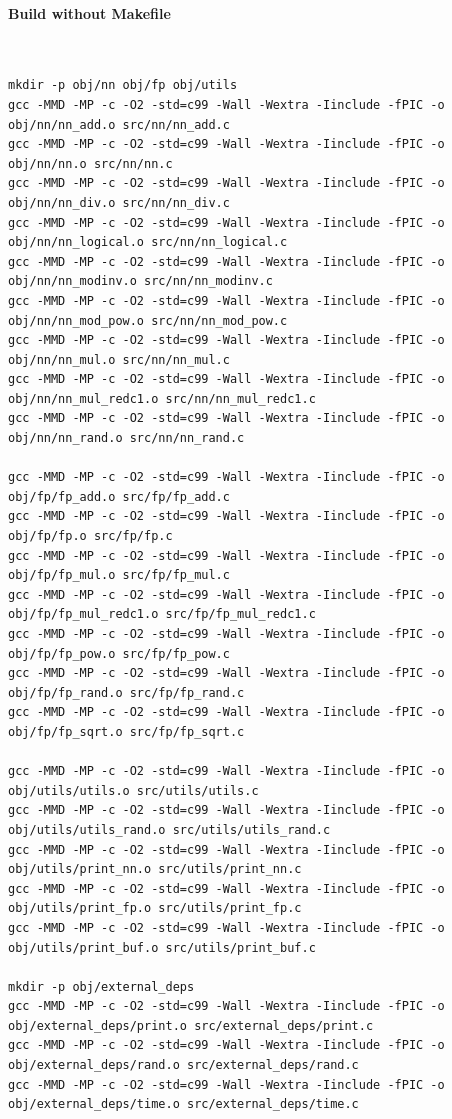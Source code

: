 \paragraph{Build without Makefile}\ \\
\begin{lstlisting}[numbers=none]
mkdir -p obj/nn obj/fp obj/utils
gcc -MMD -MP -c -O2 -std=c99 -Wall -Wextra -Iinclude -fPIC -o obj/nn/nn_add.o src/nn/nn_add.c
gcc -MMD -MP -c -O2 -std=c99 -Wall -Wextra -Iinclude -fPIC -o obj/nn/nn.o src/nn/nn.c
gcc -MMD -MP -c -O2 -std=c99 -Wall -Wextra -Iinclude -fPIC -o obj/nn/nn_div.o src/nn/nn_div.c
gcc -MMD -MP -c -O2 -std=c99 -Wall -Wextra -Iinclude -fPIC -o obj/nn/nn_logical.o src/nn/nn_logical.c
gcc -MMD -MP -c -O2 -std=c99 -Wall -Wextra -Iinclude -fPIC -o obj/nn/nn_modinv.o src/nn/nn_modinv.c
gcc -MMD -MP -c -O2 -std=c99 -Wall -Wextra -Iinclude -fPIC -o obj/nn/nn_mod_pow.o src/nn/nn_mod_pow.c
gcc -MMD -MP -c -O2 -std=c99 -Wall -Wextra -Iinclude -fPIC -o obj/nn/nn_mul.o src/nn/nn_mul.c
gcc -MMD -MP -c -O2 -std=c99 -Wall -Wextra -Iinclude -fPIC -o obj/nn/nn_mul_redc1.o src/nn/nn_mul_redc1.c
gcc -MMD -MP -c -O2 -std=c99 -Wall -Wextra -Iinclude -fPIC -o obj/nn/nn_rand.o src/nn/nn_rand.c

gcc -MMD -MP -c -O2 -std=c99 -Wall -Wextra -Iinclude -fPIC -o obj/fp/fp_add.o src/fp/fp_add.c
gcc -MMD -MP -c -O2 -std=c99 -Wall -Wextra -Iinclude -fPIC -o obj/fp/fp.o src/fp/fp.c
gcc -MMD -MP -c -O2 -std=c99 -Wall -Wextra -Iinclude -fPIC -o obj/fp/fp_mul.o src/fp/fp_mul.c
gcc -MMD -MP -c -O2 -std=c99 -Wall -Wextra -Iinclude -fPIC -o obj/fp/fp_mul_redc1.o src/fp/fp_mul_redc1.c
gcc -MMD -MP -c -O2 -std=c99 -Wall -Wextra -Iinclude -fPIC -o obj/fp/fp_pow.o src/fp/fp_pow.c
gcc -MMD -MP -c -O2 -std=c99 -Wall -Wextra -Iinclude -fPIC -o obj/fp/fp_rand.o src/fp/fp_rand.c
gcc -MMD -MP -c -O2 -std=c99 -Wall -Wextra -Iinclude -fPIC -o obj/fp/fp_sqrt.o src/fp/fp_sqrt.c

gcc -MMD -MP -c -O2 -std=c99 -Wall -Wextra -Iinclude -fPIC -o obj/utils/utils.o src/utils/utils.c
gcc -MMD -MP -c -O2 -std=c99 -Wall -Wextra -Iinclude -fPIC -o obj/utils/utils_rand.o src/utils/utils_rand.c
gcc -MMD -MP -c -O2 -std=c99 -Wall -Wextra -Iinclude -fPIC -o obj/utils/print_nn.o src/utils/print_nn.c
gcc -MMD -MP -c -O2 -std=c99 -Wall -Wextra -Iinclude -fPIC -o obj/utils/print_fp.o src/utils/print_fp.c
gcc -MMD -MP -c -O2 -std=c99 -Wall -Wextra -Iinclude -fPIC -o obj/utils/print_buf.o src/utils/print_buf.c

mkdir -p obj/external_deps
gcc -MMD -MP -c -O2 -std=c99 -Wall -Wextra -Iinclude -fPIC -o obj/external_deps/print.o src/external_deps/print.c
gcc -MMD -MP -c -O2 -std=c99 -Wall -Wextra -Iinclude -fPIC -o obj/external_deps/rand.o src/external_deps/rand.c
gcc -MMD -MP -c -O2 -std=c99 -Wall -Wextra -Iinclude -fPIC -o obj/external_deps/time.o src/external_deps/time.c


\end{lstlisting}
